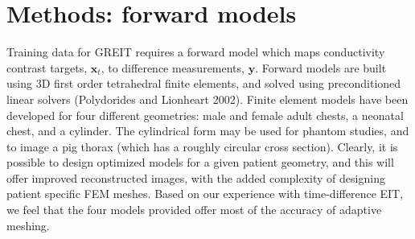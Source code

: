 \documentclass[12pt]{iopart}
\newcommand{\xB}{\mbox{$\mathbf{x}$}}
\newcommand{\yB}{\mbox{$\mathbf{y}$}}
\begin{document}
\section{Methods: forward models}

Training data for GREIT requires a forward model which
maps conductivity contrast targets, $\xB_t$, to difference
measurements, $\yB$. Forward models are built using
3D first order tetrahedral finite elements, and
solved using preconditioned linear solvers
(Polydorides and Lionheart 2002).
Finite element models have been developed for four
different geometries: 
male and female adult chests,
a neonatal chest, and
a cylinder. The cylindrical form may be used
for phantom studies, and to image a pig thorax
(which has a roughly circular cross section).
Clearly, it is possible to design optimized
models for a given patient geometry, and this
will offer improved reconstructed images,
with the added complexity of designing
patient specific FEM meshes.
Based on our experience with time-difference
EIT, we feel that the four models provided offer
most of the accuracy of adaptive meshing.
\end{document}
